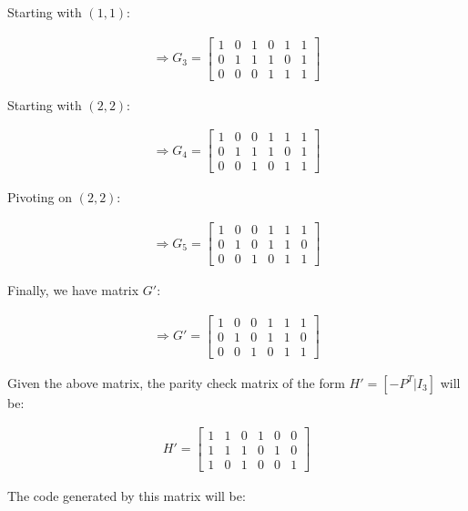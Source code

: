\documentclass{article}
\begin{document}
Starting with $(1,1)$:

\begin{align*}
  \Rightarrow G_3=\begin{bmatrix}
    1 & 0 & 1 & 0 & 1 & 1\\
    0 & 1 & 1 & 1 & 0 & 1\\
    0 & 0 & 0 & 1 & 1 & 1
  \end{bmatrix}
\end{align*}

Starting with $(2,2)$:

\begin{align*}
  \Rightarrow G_4=\begin{bmatrix}
    1 & 0 & 0 & 1 & 1 & 1\\
    0 & 1 & 1 & 1 & 0 & 1\\
    0 & 0 & 1 & 0 & 1 & 1
  \end{bmatrix}
\end{align*}

Pivoting on $(2,2)$:

\begin{align*}
  \Rightarrow G_5=\begin{bmatrix}
    1 & 0 & 0 & 1 & 1 & 1\\
    0 & 1 & 0 & 1 & 1 & 0\\
    0 & 0 & 1 & 0 & 1 & 1
  \end{bmatrix}
\end{align*}

Finally, we have matrix $G'$:

\begin{align*}
  \Rightarrow G'=\begin{bmatrix}
    1 & 0 & 0 & 1 & 1 & 1\\
    0 & 1 & 0 & 1 & 1 & 0\\
    0 & 0 & 1 & 0 & 1 & 1
  \end{bmatrix}
\end{align*}

Given the above matrix, the parity check matrix of the form $H'=[-P^T|I_3]$
will be:

\begin{align*}
  H'=\begin{bmatrix}
    1 & 1 & 0 & 1 & 0 & 0 \\
    1 & 1 & 1 & 0 & 1 & 0 \\
    1 & 0 & 1 & 0 & 0 & 1
  \end{bmatrix}
\end{align*}

The code generated by this matrix will be:
\end{document}
